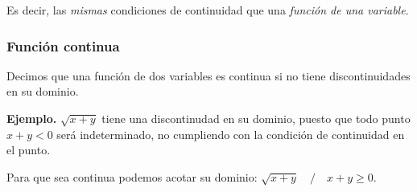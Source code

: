 Es decir,
las \textit{mismas} condiciones de continuidad que una \textit{función de una 
variable}.

\subsubsection{Función continua}

Decimos que una función de dos variables es continua si no tiene 
discontinuidades en su dominio.

\textbf{Ejemplo.}
\(\sqrt{x+y}\) tiene una discontinudad en su dominio, puesto que todo punto 
\(x+y<0\) será indeterminado, no cumpliendo con la condición de continuidad en 
el punto. 

Para que sea continua podemos acotar su dominio:
\(\sqrt{x+y} \quad/\quad x+y \geq 0\).